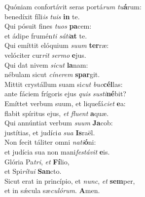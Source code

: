 \evenverse Quóniam confortávit seras portá\textit{rum} \textit{tu}\textbf{á}rum:~\*\\
\evenverse benedíxit fíli\textit{is} \textit{tu}\textit{is} \textbf{in} te.\\
\oddverse Qui pósuit fines \textit{tu}\textit{os} \textbf{pa}cem:~\*\\
\oddverse et ádipe frumén\textit{ti} \textit{sá}\textit{ti}\textbf{at} te.\\
\evenverse Qui emíttit elóquium \textit{su}\textit{um} \textbf{ter}ræ:~\*\\
\evenverse velóciter cur\textit{rit} \textit{ser}\textit{mo} \textbf{e}jus.\\
\oddverse Qui dat nivem \textit{si}\textit{cut} \textbf{la}nam:~\*\\
\oddverse nébulam sicut \textit{cí}\textit{ne}\textit{rem} \textbf{spar}git.\\
\evenverse Mittit crystállum suam si\textit{cut} \textit{buc}\textbf{cél}las:~\*\\
\evenverse ante fáciem frígoris ejus \textit{quis} \textit{su}\textit{sti}\textbf{né}bit?\\
\oddverse Emíttet verbum suum, et liquefá\textit{ci}\textit{et} \textbf{e}a:~\*\\
\oddverse flabit spíritus ejus, \textit{et} \textit{flu}\textit{ent} \textbf{a}quæ.\\
\evenverse Qui annúntiat verbum \textit{su}\textit{um} \textbf{Ja}cob:~\*\\
\evenverse justítias, et judíci\textit{a} \textit{su}\textit{a} \textbf{Is}raël.\\
\oddverse Non fecit táliter omni \textit{na}\textit{ti}\textbf{ó}ni:~\*\\
\oddverse et judícia sua non mani\textit{fe}\textit{stá}\textit{vit} \textbf{e}is.\\
\evenverse Glória Pa\textit{tri}, \textit{et} \textbf{Fí}lio,~\*\\
\evenverse et Spi\textit{rí}\textit{tu}\textit{i} \textbf{San}cto.\\
\oddverse Sicut erat in princípio, et \textit{nunc}, \textit{et} \textbf{sem}per,~\*\\
\oddverse et in sǽcula sæ\textit{cu}\textit{ló}\textit{rum}. \textbf{A}men.\\
